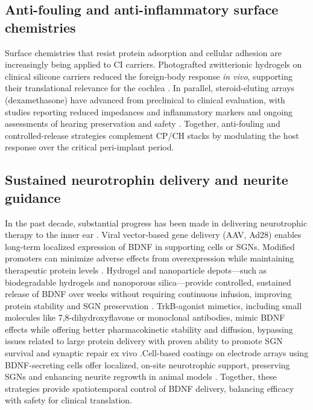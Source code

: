 \documentclass[referee,pdflatex, sn-vancouver-num]{sn-jnl}%
\theoremstyle{thmstyleone}%
\theoremstyle{thmstyletwo}%
\theoremstyle{thmstylethree}%
\begin{document}
\subsection{Anti-fouling and anti-inflammatory surface chemistries}
Surface chemistries that resist protein adsorption and cellular adhesion are increasingly being applied to CI carriers. Photografted zwitterionic hydrogels on clinical silicone carriers reduced the foreign-body response \textit{in vivo}, supporting their translational relevance for the cochlea \cite{Horne2023_ActaBiomater_ZwitterionCI}. In parallel, steroid-eluting arrays (dexamethasone) have advanced from preclinical to clinical evaluation, with studies reporting reduced impedances and inflammatory markers and ongoing assessments of hearing preservation and safety \cite{Kiefer2008Dexameth,Briggs2020,xu2018,Rahman2024,Toulemonde2021}. Together, anti-fouling and controlled-release strategies complement CP/CH stacks by modulating the host response over the critical peri-implant period.

\subsection{Sustained neurotrophin delivery and neurite guidance}
In the past decade, substantial progress has been made in delivering neurotrophic therapy to the inner ear \cite{StPeter2022}. Viral vector‑based gene delivery (AAV, Ad28) enables long-term localized expression of BDNF in supporting cells or SGNs. Modified promoters can minimize adverse effects from overexpression while maintaining therapeutic protein levels \cite{Leake2019, Mukherjee2022}. Hydrogel and nanoparticle depots—such as biodegradable hydrogels and nanoporous silica—provide controlled, sustained release of BDNF over weeks without requiring continuous infusion, improving protein stability and SGN preservation \cite{Wise2016, Yu2024, Zhang2024_JNanoBiotech_SGNProtect}. TrkB‑agonist mimetics, including small molecules like 7,8‑dihydroxyflavone or monoclonal antibodies, mimic BDNF effects while offering better pharmacokinetic stability and diffusion, bypassing issues related to large protein delivery with proven ability to promote SGN survival and synaptic repair ex vivo \cite{Szobota2019}.Cell-based coatings on electrode arrays using BDNF-secreting cells offer localized, on-site neurotrophic support, preserving SGNs and enhancing neurite regrowth in animal models \cite{Scheper2019}. Together, these strategies provide spatiotemporal control of BDNF delivery, balancing efficacy with safety for clinical translation.
\end{document}
